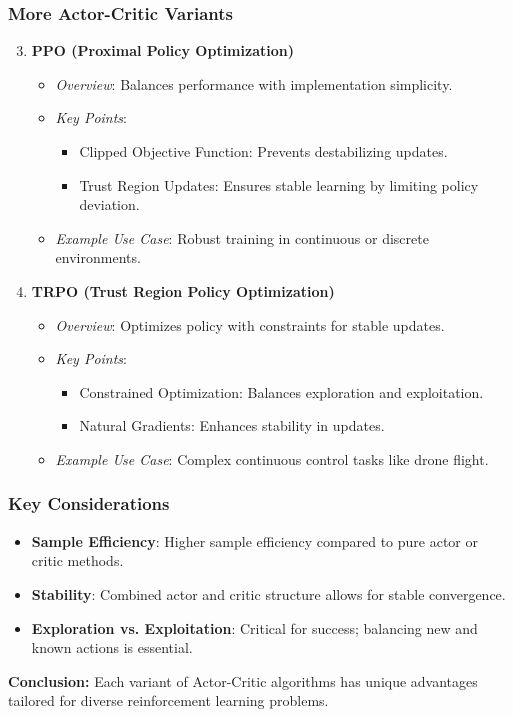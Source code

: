 \documentclass[aspectratio=169]{beamer}
\begin{document}
\begin{frame}[fragile]
    \frametitle{More Actor-Critic Variants}
    \begin{enumerate}
        \setcounter{enumi}{2}
        \item \textbf{PPO (Proximal Policy Optimization)}
        \begin{itemize}
            \item \textit{Overview}: Balances performance with implementation simplicity.
            \item \textit{Key Points}:
            \begin{itemize}
                \item Clipped Objective Function: Prevents destabilizing updates.
                \item Trust Region Updates: Ensures stable learning by limiting policy deviation.
            \end{itemize}
            \item \textit{Example Use Case}: Robust training in continuous or discrete environments.
        \end{itemize}

        \item \textbf{TRPO (Trust Region Policy Optimization)}
        \begin{itemize}
            \item \textit{Overview}: Optimizes policy with constraints for stable updates.
            \item \textit{Key Points}:
            \begin{itemize}
                \item Constrained Optimization: Balances exploration and exploitation.
                \item Natural Gradients: Enhances stability in updates.
            \end{itemize}
            \item \textit{Example Use Case}: Complex continuous control tasks like drone flight.
        \end{itemize}
    \end{enumerate}
\end{frame}

\begin{frame}[fragile]
    \frametitle{Key Considerations}
    \begin{itemize}
        \item \textbf{Sample Efficiency}: Higher sample efficiency compared to pure actor or critic methods.
        \item \textbf{Stability}: Combined actor and critic structure allows for stable convergence.
        \item \textbf{Exploration vs. Exploitation}: Critical for success; balancing new and known actions is essential.
    \end{itemize}
    
    \textbf{Conclusion:} Each variant of Actor-Critic algorithms has unique advantages tailored for diverse reinforcement learning problems.
\end{frame}
\end{document}
